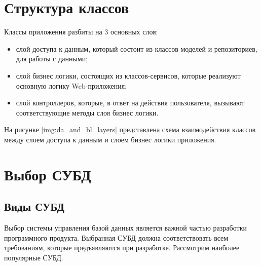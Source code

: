 \section{Структура классов}

Классы приложения разбиты на 3 основных слоя:

\begin{itemize}
    \item слой доступа к данным, который состоит из классов моделей и репозиториев, для работы с данными;
    \item слой бизнес логики, состоящих из классов-сервисов, которые реализуют основную логику Web-приложения;
    \item слой контроллеров, которые, в ответ на действия пользователя, вызывают соответствующие методы слоя бизнес логики.
\end{itemize}

На рисунке \ref{img:da_and_bl_layers} представлена схема взаимодействия классов между слоем доступа к данным и слоем бизнес логики приложения. 

\newpage


\section{Выбор СУБД}

\subsection{Виды СУБД}

Выбор системы управления базой данных является важной частью разработки программного продукта. Выбранная СУБД должна соответствовать всем требованиям, которые предъявляются при разработке. Рассмотрим наиболее популярные СУБД. 

